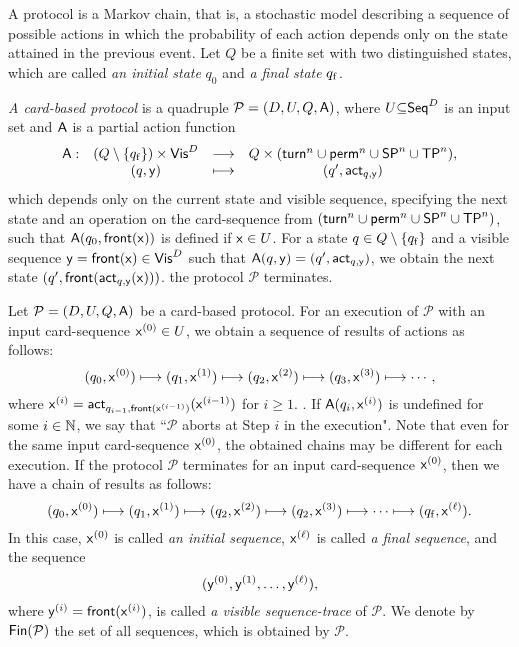 A protocol is a Markov chain, that  is, a stochastic model describing a sequence of possible actions in which the probability of each action depends only on the state attained in the previous event.
Let $Q$ be a finite set with two distinguished states, which are called \textit{an initial state} $q_0$ and \textit{a final state} $q_{\rm f}$.

\begin{definition}
\textit{A card-based protocol} is a quadruple $\mathcal{P}=(D,U,Q,\mathsf{A})$, where $U\textcolor{black}{\subseteq} \mathsf{Seq}^D$ is an input set and $\mathsf{A}$ is a partial action function
\[ 
\begin{array}{cccc}
 \mathsf{A}:  & (Q\setminus\{q_{\rm f}\})\times \mathsf{Vis}^D &  \longrightarrow &  Q\times (\mathsf{turn}^n\cup\mathsf{perm}^n\cup \mathsf{SP}^n\cup \mathsf{TP}^n), \\
           & (q,\mathsf{y})                                                    & \longmapsto & (q',\mathsf{act}_{q,\mathsf{y}})
 \end{array} \]
which depends only on the current state and visible sequence, specifying the next state and an operation on the card-sequence from $(\mathsf{turn}^n\cup\mathsf{perm}^n\cup \mathsf{SP}^n\cup \mathsf{TP}^n)$, such that $\mathsf{A}(q_0,\mathsf{front(x)})$ is defined if $\mathsf{x}\in U$.
For a state $q\in Q\setminus\{q_{\rm f}\}$ and a visible sequence $\mathsf{y}=\mathsf{front(x)}\in \mathsf{Vis}^D$ such that $\mathsf{A}(q,\mathsf{y})=(q',\mathsf{act}_{q,\mathsf{y}})$, we obtain the next state $(q' ,\mathsf{front}(\mathsf{act}_{q,\mathsf{y}}(\mathsf{x})))$.
the protocol $\mathcal{P}$ terminates. 
\end{definition}

Let $\mathcal{P}=(D,U,Q,\mathsf{A})$ be a card-based protocol.
For an execution of $\mathcal{P}$ with an input card-sequence $\mathsf{x}^{(0)}\in U$, we obtain a sequence of results of actions as follows:
\[ (q_0,\mathsf{x}^{(0)})\longmapsto (q_1,\mathsf{x}^{(1)})\longmapsto (q_2,\mathsf{x}^{(2)})\longmapsto(\textcolor{black}{q_3},\mathsf{x}^{(3)})\longmapsto \cdots,\]
where $\mathsf{x}^{(i)}=\mathsf{act}_{q_{i-1},\mathsf{front}(\mathsf{x}^{(i-1)})}(\textcolor{black}{\mathsf{x}^{(i-1)}})$ for $i\geq 1$. . 
If  $\mathsf{A}(q_i,\mathsf{x}^{(i)})$ is undefined for some $i \in \mathbb{N}$, we say that ``$\mathcal{P}$ aborts at Step $i$ in the execution". 
Note that even for the same input card-sequence $\mathsf{x}^{(0)}$, the obtained chains may be different for each execution.
If the protocol $\mathcal{P}$ terminates for an input card-sequence $\mathsf{x}^{(0)}$, then we have a chain of results as follows:
\[ (q_0,\mathsf{x}^{(0)})\longmapsto (q_1,\mathsf{x}^{(1)})\longmapsto (q_2,\mathsf{x}^{(2)})\longmapsto(q_2,\mathsf{x}^{(3)})\longmapsto \cdots \longmapsto (q_{\rm f},\mathsf{x}^{(\ell)}).\]
In this case, $\mathsf{x}^{(0)}$ is called \textit{an initial sequence}, $\mathsf{x}^{(\ell)}$ is called \textit{a final sequence}, and the sequence 
\[ (\mathsf{y}^{(0)},\mathsf{y}^{(1)},\ldots, \mathsf{y}^{(\ell)}), \]
where $\mathsf{y}^{(i)}=\mathsf{front}(\mathsf{x}^{(i)})$, is called \textit{a visible sequence-trace} of $\mathcal{P}$. 
We denote by $\mathsf{Fin}(\mathcal{P})$ the set of  all  sequences, which is obtained by $\mathcal{P}$.

